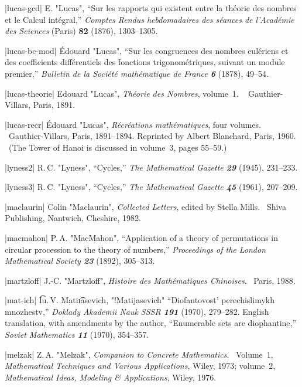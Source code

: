 \bib|lucas-gcd|%
E. "Lucas", ``Sur les rapports qui existent entre la th\'eorie des nombres
et le Calcul int\'egral,''
 {\sl Comptes Rendus hebdomadaires des s\'eances de l'Acad\'emie des
 Sciences\/} (Paris) {\bf82} (1876), 1303--1305.

\bib|lucas-bc-mod|%
\'Edouard "Lucas", ``Sur les congruences des nombres eul\'eriens et des
coefficients diff\'erentiels des fonctions trigonom\'etriques, suivant un
module premier,''
{\sl Bulletin de la Soci\'et\'e math\'ematique de
France\/ \bf6} (1878), \hbox{49--54}.

\bib|lucas-theorie|%
Edouard "Lucas", {\sl Th\'eorie des Nombres}, volume~1. \ %
Gauthier-Villars, Paris, 1891.

\bib|lucas-recr|%
\'Edouard "Lucas", {\sl R\'ecr\'eations math\'ematiques}, four volumes. \
Gauthier-Villars, Paris, 1891--1894. Reprinted by Albert Blanchard, Paris, 1960.
\ (The Tower of Hanoi is discussed in volume~3, pages 55--59.)


\bib|lyness2|%
R.\,C. "Lyness", ``Cycles,'' {\sl The Mathematical Gazette\/ \bf29} (1945),
231--233.

\bib|lyness3|%
R.\,C. "Lyness", ``Cycles,'' {\sl The Mathematical Gazette\/ \bf45} (1961),
207--209.

\bib|maclaurin|%
Colin "Maclaurin", {\sl Collected Letters}, edited by Stella Mills. \
Shiva Publishing, Nantwich, Cheshire, 1982.

\bib|macmahon|%
P.\,A. "MacMahon", ``Application of a theory of permutations in circular
procession to the theory of numbers,''
{\sl Proceedings of the London Mathematical Society\/ \bf23} (1892), 305--313.

\bib|martzloff|%
J.-C. "Martzloff", {\sl Histoire des Math\'ematiques Chinoises}. \
Paris, 1988.

\bib|mat-ich|%
\t Iu.\,V. Mati{\t\i}asevich, "!Matijasevich"
``Diofantovost' perechislimykh mnozhestv,''
{\sl Doklady Akademii Nauk SSSR\/ \bf191} (1970), 279--282. English translation,
with amendments by the author, ``Enumerable sets are diophantine,''
{\sl Soviet Mathematics\/ \bf11} (1970), 354--357.

\bib|melzak|%
Z.\,A. "Melzak", {\sl Companion to Concrete Mathematics}. \
Volume~1, {\sl Mathematical Techniques and Various Applications}, Wiley,
1973; volume~2, {\sl Mathematical Ideas, Modeling \& Applications}, Wiley, 1976.

